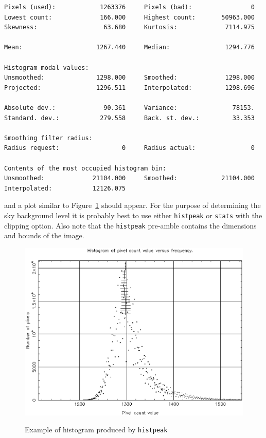 \documentclass[twoside,11pt]{article}
\begin{document}
\begin{enumerate}
\begin{verbatim}
Pixels (used):            1263376     Pixels (bad):                0
Lowest count:             166.000     Highest count:       50963.000
Skewness:                  63.680     Kurtosis:             7114.975

Mean:                    1267.440     Median:               1294.776

Histogram modal values:
Unsmoothed:              1298.000     Smoothed:             1298.000
Projected:               1296.511     Interpolated:         1298.696

Absolute dev.:             90.361     Variance:               78153.
Standard. dev.:           279.558     Back. st. dev.:         33.353

Smoothing filter radius:
Radius request:                 0     Radius actual:               0

Contents of the most occupied histogram bin:
Unsmoothed:             21104.000     Smoothed:            21104.000
Interpolated:           12126.075
\end{verbatim}

   and a plot similar to Figure~\ref{HISTPEAK} should appear.  For the
   purpose of determining the sky background level it is probably best
   to use either {\tt histpeak} or {\tt stats} with the clipping option.
   Also note that the {\tt histpeak} pre-amble contains the dimensions and
   bounds of the image.

\end{enumerate}

\begin{figure}[htbp]
   \centering
   \includegraphics[totalheight=4in]{sc5_histpeak.ps}
   \begin{quote}
   \caption{Example of histogram produced by {\tt histpeak}
   \label{HISTPEAK} }
   \end{quote}
\end{figure}
\end{document}
